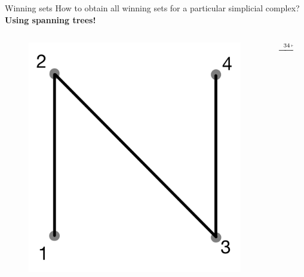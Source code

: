 \documentclass{beamer}
\begin{document}
\begin{frame}{Winning sets}
How to obtain all winning sets for a particular simplicial complex?
\pause
\textbf{Using spanning trees!}
\pause
\begin{columns}
\begin{column}{0.45\textwidth}
   \begin{figure}
        \centering
        \includegraphics[scale=0.08]{images/SpanningTree.png}
    \end{figure}
\end{column}
\pause\begin{column}{0.1\textwidth}
$$\Large \xrightarrow{34\,\mapsto 234}$$
\end{column}
\pause
\begin{column}{0.45\textwidth} 
    \begin{center}

\end{center}
\end{column}
\end{columns}
\end{frame}
\end{document}
